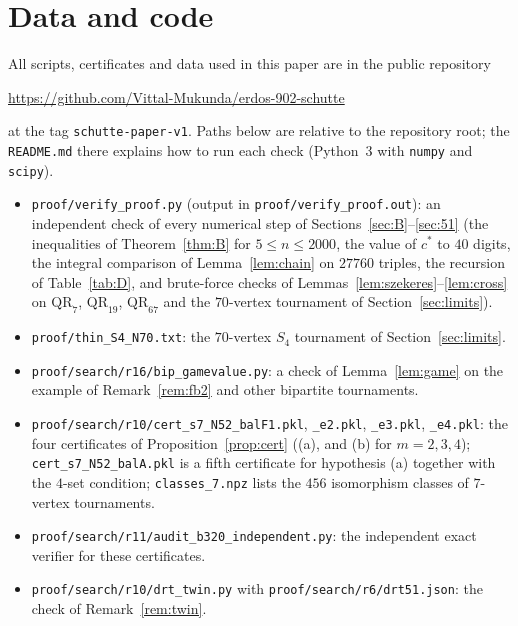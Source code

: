 \documentclass[11pt]{amsart}
\theoremstyle{definition}
\theoremstyle{remark}
\newcommand{\QR}{\mathrm{QR}}
\newcommand{\cs}{c^{*}}
\begin{document}
\section{Data and code}\label{sec:data}

All scripts, certificates and data used in this paper are in the public repository
\begin{center}
\url{https://github.com/Vittal-Mukunda/erdos-902-schutte}
\end{center}
at the tag \texttt{schutte-paper-v1}. Paths below are relative to the repository root; the \texttt{README.md} there explains how to
run each check (Python~3 with \texttt{numpy} and \texttt{scipy}).
\begin{itemize}\sloppy
\item \texttt{proof/verify\_proof.py} (output in \texttt{proof/verify\_proof.out}): an independent check of every numerical step of
Sections~\ref{sec:B}--\ref{sec:51} (the inequalities of Theorem~\ref{thm:B} for $5\le n\le2000$, the value of $\cs$ to $40$ digits,
the integral comparison of Lemma~\ref{lem:chain} on $27760$ triples, the recursion of Table~\ref{tab:D}, and brute-force checks of
Lemmas~\ref{lem:szekeres}--\ref{lem:cross} on $\QR_7$, $\QR_{19}$, $\QR_{67}$ and the $70$-vertex tournament of
Section~\ref{sec:limits}).
\item \texttt{proof/thin\_S4\_N70.txt}: the $70$-vertex $S_4$ tournament of Section~\ref{sec:limits}.
\item \texttt{proof/search/r16/bip\_gamevalue.py}: a check of Lemma~\ref{lem:game} on the example of Remark~\ref{rem:fb2} and other
bipartite tournaments.
\item \texttt{proof/search/r10/cert\_s7\_N52\_balF1.pkl}, \texttt{\_e2.pkl}, \texttt{\_e3.pkl}, \texttt{\_e4.pkl}: the four
certificates of Proposition~\ref{prop:cert} ((a), and (b) for $m=2,3,4$); \texttt{cert\_s7\_N52\_balA.pkl} is a fifth certificate
for hypothesis (a) together with the $4$-set condition; \texttt{classes\_7.npz} lists the $456$ isomorphism classes of $7$-vertex
tournaments.
\item \texttt{proof/search/r11/audit\_b320\_independent.py}: the independent exact verifier for these certificates.
\item \texttt{proof/search/r10/drt\_twin.py} with \texttt{proof/search/r6/drt51.json}: the check of Remark~\ref{rem:twin}.
\end{itemize}
\end{document}
